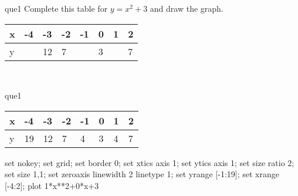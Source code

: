 \documentclass[13.5pt, varwidth=true]{beamer}
\begin{document}
\begin{frame}[shrink=19,fragile]
	\begin{beamercolorbox}[rounded=true, left, shadow=true,wd=14.8cm]{que1}
		 Complete this table for $y = x^{2} + 3$ and draw the graph. \\[0.3cm] \renewcommand{\arraystretch}{1.2}\begin{tabular}{|C|C|C|C|C|C|C|C|} \hline x & -4 & -3 & -2 & -1 & 0 & 1 & 2 \\ \hline y &  & 12 & 7 &  & 3 &  & 7\\ \hline \end{tabular}\\[0.3cm]
	\end{beamercolorbox}
\end{frame}
\begin{frame}[shrink=19,fragile]
	\begin{beamercolorbox}[rounded=true, left, shadow=true,wd=14.8cm]{que1}
		\renewcommand{\arraystretch}{1.2}\begin{tabular}{|C|C|C|C|C|C|C|C|} \hline x & -4 & -3 & -2 & -1 & 0 & 1 & 2 \\ \hline y & 19 & 12 & 7 & 4 & 3 & 4 & 7\\ \hline \end{tabular}\begin{gnuplot}[terminal=pdf] set nokey; set grid; set border 0; set xtics axis 1; set ytics axis 1; set size ratio 2; set size 1,1; set zeroaxis linewidth 2 linetype 1; set yrange [-1:19]; set xrange [-4:2]; plot 1*x**2+0*x+3 \end{gnuplot}
	\end{beamercolorbox}
\end{frame}
\end{document}
